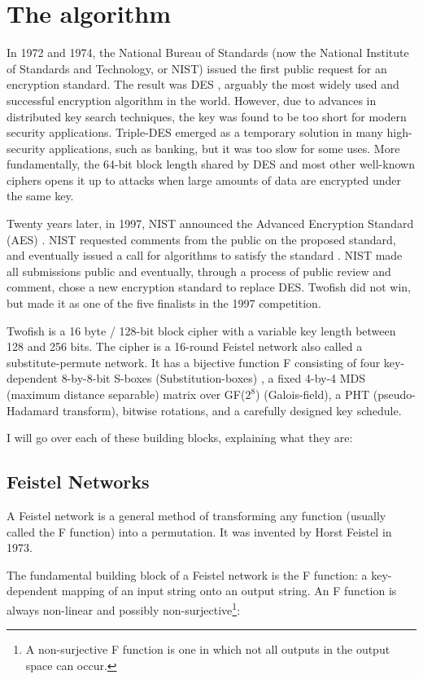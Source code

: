 \section{The algorithm}
In 1972 and 1974, the National Bureau of Standards (now the National Institute of Standards and Technology, or NIST) issued the first public request for an encryption standard. The result was DES \cite{NBS77}, arguably the most widely used and successful encryption algorithm in the world. However, due to advances in distributed key search techniques, the key was found to be too short for modern security applications.
Triple-DES emerged as a temporary solution in many high-security applications, such as banking, but it was too slow for some uses. More fundamentally, the 64-bit block length shared by DES and most other well-known ciphers opens it up to attacks when large amounts of data are encrypted under the same key.

Twenty years later, in 1997, NIST announced the Advanced Encryption Standard (AES) \cite{NIST97a}. NIST requested comments from the public on the proposed standard, and eventually issued a call for algorithms to satisfy the standard \cite{NIST97b}. NIST made all submissions public and eventually, through a process of public review and comment, chose a new encryption standard to replace DES. Twofish did not win, but made it as one of the five finalists in the 1997 competition.

Twofish is a 16 byte / 128-bit block cipher with a variable key length between 128 and 256 bits. The cipher is a 16-round Feistel network also called a substitute-permute network. It has a bijective function F consisting of four key-dependent 8-by-8-bit S-boxes (Substitution-boxes) \cite{wiki_sbox}, a fixed 4-by-4 MDS (maximum distance separable) matrix over GF($2^8$) (Galois-field), a PHT (pseudo-Hadamard transform), bitwise rotations, and a carefully designed key schedule.

I will go over each of these building blocks, explaining what they are:

\subsection{Feistel Networks}
A Feistel network is a general method of transforming any function (usually called the F function) into a permutation. It was invented by Horst Feistel in 1973.

The fundamental building block of a Feistel network is the F function: a key-dependent mapping of an input string onto an output string. An F function is always non-linear and possibly non-surjective\footnote{A non-surjective F function is one in which not all outputs in the output space can occur.}:

